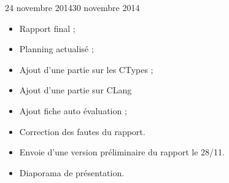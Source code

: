 \documentclass[11pt, french, screen]{report-rd-info}
\begin{document}
\begin{fichesuivi}{24 novembre 2014}{30 novembre 2014}

	\begin{travaileffectue}
	    \begin{itemize}
	        \item Rapport final ;
            \item Planning actualisé ;
            \item Ajout d'une partie sur les CTypes ;
            \item Ajout d'une partie sur CLang
            \item Ajout fiche auto évaluation ;
            \item Correction des fautes du rapport.
	    \end{itemize}
	\end{travaileffectue}

	\begin{travailnoneffectue}
	\end{travailnoneffectue}

	\begin{echange}
	    \begin{itemize}
	        \item Envoie d'une version préliminaire du rapport le 28/11.
	    \end{itemize}
	\end{echange}

	\begin{planification}
	    \begin{itemize}
	        \item Diaporama de présentation.
	    \end{itemize}
	\end{planification}
\end{fichesuivi}

\begin{fichesuivi}{}{}

	\begin{travaileffectue}
	\end{travaileffectue}

	\begin{travailnoneffectue}
	\end{travailnoneffectue}

	\begin{echange}
	\end{echange}

	\begin{planification}
	\end{planification}
\end{fichesuivi}
\end{document}
